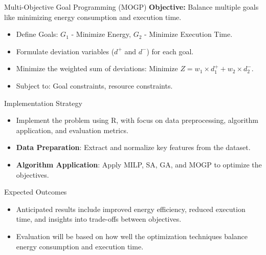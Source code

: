 \documentclass{beamer}
\begin{document}
\begin{frame}{Multi-Objective Goal Programming (MOGP)}
    \textbf{Objective:} Balance multiple goals like minimizing energy consumption and execution time.
    \begin{itemize}
        \item Define Goals: \(G_1\) - Minimize Energy, \(G_2\) - Minimize Execution Time.
        \item Formulate deviation variables (\(d^+\) and \(d^-\)) for each goal.
        \item Minimize the weighted sum of deviations: \(\text{Minimize } Z = w_1 \times d_1^+ + w_2 \times d_2^-\).
        \item Subject to: Goal constraints, resource constraints.
    \end{itemize}
\end{frame}

\begin{frame}{Implementation Strategy}
    \begin{itemize}
        \item Implement the problem using R, with focus on data preprocessing, algorithm application, and evaluation metrics.
        \item \textbf{Data Preparation}: Extract and normalize key features from the dataset.
        \item \textbf{Algorithm Application}: Apply MILP, SA, GA, and MOGP to optimize the objectives.
    \end{itemize}
\end{frame}

\begin{frame}{Expected Outcomes}
    \begin{itemize}
        \item Anticipated results include improved energy efficiency, reduced execution time, and insights into trade-offs between objectives.
        \item Evaluation will be based on how well the optimization techniques balance energy consumption and execution time.
    \end{itemize}
\end{frame}
\end{document}
